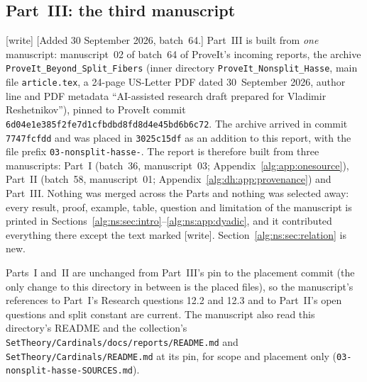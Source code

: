 \documentclass[11pt]{article}
\numberwithin{equation}{section}
\theoremstyle{plain}
\theoremstyle{plain}
\theoremstyle{plain}
\theoremstyle{definition}
\theoremstyle{definition}
\theoremstyle{definition}
\theoremstyle{remark}
\newcommand{\wtag}{\textup{[write]}}%
\newcommand{\rpath}[1]{\nolinkurl{#1}}
\newcommand{\nssha}{\nolinkurl{6d04e1e385f2fe7d1cfbdbd8fd8d4e45bd6b6c72}}
\begin{document}
\subsection{Part~III: the third manuscript}\label{alg:ns:app:provenance}
\wtag{} [Added 30 September 2026, batch~64.] Part~III is built from
\emph{one} manuscript: manuscript~02 of batch~64 of ProveIt's incoming
reports, the archive \texttt{ProveIt\_Beyond\_Split\_Fibers} (inner
directory \texttt{ProveIt\_Nonsplit\_Hasse}, main file
\texttt{article.tex}, a 24-page US-Letter PDF dated 30~September 2026,
author line and PDF metadata ``AI-assisted research draft prepared for
Vladimir Reshetnikov''), pinned to ProveIt commit \nssha. The archive
arrived in commit \texttt{7747fcfdd} and was placed in
\texttt{3025c15df} as an addition to this report, with the file prefix
\texttt{03-nonsplit-hasse-}. The report is therefore built from three
manuscripts: Part~I (batch~36, manuscript~03;
Appendix~\ref{alg:app:onesource}), Part~II (batch~58, manuscript~01;
Appendix~\ref{alg:dh:app:provenance}) and Part~III. Nothing was merged
across the Parts and nothing was selected away: every result, proof,
example, table, question and limitation of the manuscript is printed in
Sections~\ref{alg:ns:sec:intro}--\ref{alg:ns:app:dyadic}, and it
contributed everything there except the text marked \wtag.
Section~\ref{alg:ns:sec:relation} is new.

Parts~I and~II are unchanged from Part~III's pin to the placement commit
(the only change to this directory in between is the placed files), so
the manuscript's references to Part~I's Research questions 12.2 and 12.3
and to Part~II's open questions and split constant are current. The
manuscript also read this directory's README and the collection's
\rpath{SetTheory/Cardinals/docs/reports/README.md} and
\rpath{SetTheory/Cardinals/README.md} at its pin, for scope and placement
only (\rpath{03-nonsplit-hasse-SOURCES.md}).
\end{document}
